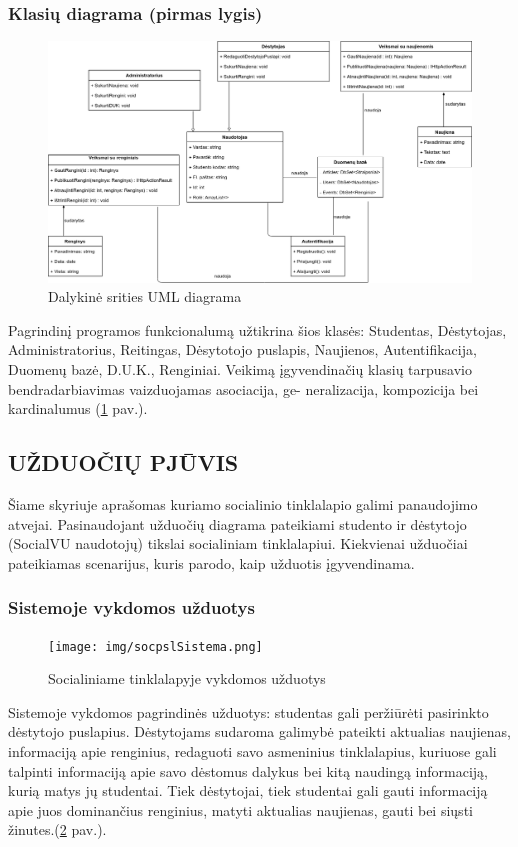 \documentclass{VUMIFPSkursinis}
\begin{document}
\subsubsection{Klasių diagrama (pirmas lygis)}
\begin{figure}[H]
	\centering
	\includegraphics[width=\linewidth]{img/pagrindine.png}
	\caption{Dalykinė srities UML diagrama}
	\label{fig:pagrindine}
\end{figure}
Pagrindinį programos funkcionalumą užtikrina šios klasės: Studentas, Dėstytojas, Administratorius, Reitingas, Dėsytotojo puslapis, Naujienos, Autentifikacija, Duomenų bazė,
D.U.K., Renginiai. Veikimą įgyvendinačių klasių tarpusavio bendradarbiavimas vaizduojamas asociacija, ge-
neralizacija, kompozicija bei kardinalumus (\ref{fig:pagrindine}  pav.).
\newpage
\subsection{UŽDUOČIŲ PJŪVIS}
Šiame skyriuje aprašomas kuriamo socialinio tinklalapio galimi panaudojimo atvejai. Pasinaudojant užduočių diagrama pateikiami studento ir dėstytojo (SocialVU naudotojų) tikslai socialiniam tinklalapiui. Kiekvienai užduočiai pateikiamas scenarijus, kuris parodo, kaip užduotis įgyvendinama.
\subsubsection{Sistemoje vykdomos užduotys}
\begin{figure}[H]
	\centering
	\texttt{[image: img/socpslSistema.png]}
	\caption{Socialiniame tinklalapyje vykdomos užduotys}
	\label{fig:socpslsist}
\end{figure}
Sistemoje vykdomos pagrindinės užduotys: studentas gali peržiūrėti pasirinkto dėstytojo puslapius. Dėstytojams sudaroma galimybė pateikti aktualias naujienas, informaciją apie renginius, redaguoti savo asmeninius tinklalapius, kuriuose gali talpinti informaciją apie savo dėstomus dalykus bei kitą naudingą informaciją, kurią matys jų studentai. Tiek dėstytojai, tiek studentai gali gauti informaciją apie juos dominančius renginius, matyti aktualias naujienas, gauti bei siųsti žinutes.(\ref{fig:socpslsist} pav.).
\end{document}

